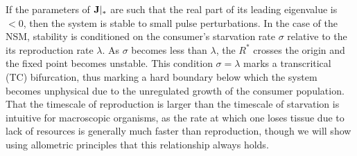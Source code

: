 \documentclass[12pt,english]{article}
\begin{document}
\begin{spacing}{1.9}
If the parameters of $\bf J|_*$ are such that the real part of its leading eigenvalue is $<0$, then the system is stable to small pulse perturbations. 
In the case of the NSM, stability is conditioned on the consumer's starvation rate $\sigma$ relative to the its reproduction rate $\lambda$.
As $\sigma$ becomes less than $\lambda$, the $R^*$ crosses the origin and the fixed point becomes unstable.
This condition $\sigma = \lambda$  marks a transcritical (TC) bifurcation, thus marking a hard boundary below which the system becomes unphysical due to the unregulated growth of the consumer population.
That the timescale of reproduction is larger than the timescale of starvation is intuitive for macroscopic organisms, as the rate at which one loses tissue due to lack of resources is generally much faster than reproduction, though we will show using allometric principles that this relationship always holds.



\end{spacing}
\end{document}
